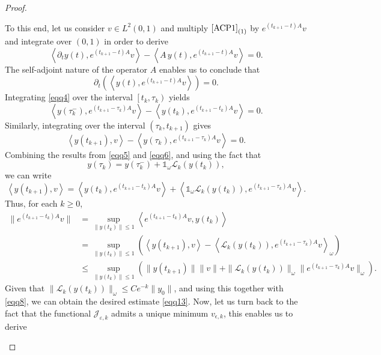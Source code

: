 \documentclass[sn-mathphys]{sn-jnl}
\begin{document}
\begin{proof}
\begin{enumerate}
\begin{equation}
    \end{equation}
    To this end, let us consider $v \in L^2(0,1)$ and multiply \(\eqref{ACP1}_{(1)}\) by $e^{(t_{k+1}-t)A} v$ and integrate over $(0,1)$ in order to derive
    \[\left\langle \partial_t y(t) , e^{(t_{k+1}-t)A} v \right\rangle - \left\langle A \,y(t) , e^{(t_{k+1}-t)A} v \right\rangle=0.\]
    The self-adjoint nature of the operator $A$ enables us to conclude that 
    \begin{equation}\label{eqq4}
        \partial_t \left( \left\langle y (t), e^{(t_{k+1}-t)A} v \right\rangle \right) =0.
    \end{equation}
    Integrating \eqref{eqq4} over the interval $\left[t_k , \tau_k\right)$ yields
    \begin{equation}\label{eqq5}
        \left\langle y(\tau_k^{-}) , e^{(t_{k+1}-\tau_k)A} v \right\rangle - \left\langle y(t_k) , e^{(t_{k+1}-t_k)A} v \right\rangle =0.
    \end{equation}
     Similarly, integrating over the interval  $\left(\tau_k, t_{k+1}\right)$ gives
    \begin{equation}\label{eqq6}
        \left\langle y(t_{k+1}) ,  v \right\rangle - \left\langle y(\tau_k) , e^{(t_{k+1}-\tau_k)A} v \right\rangle   =0.
    \end{equation}
    Combining the results from \eqref{eqq5} and \eqref{eqq6}, and using the fact that
    \[y(\tau_k) = y(\tau^{-}_{k}) + \mathds{1}_{\omega} \mathcal{L}_k (y(t_k)),\] 
    we can write
    \begin{equation}
        \left\langle y(t_{k+1}) , v \right\rangle = \left\langle y(t_k) , e^{(t_{k+1}-t_k)A} v \right\rangle + \left\langle \mathds{1}_{\omega} \mathcal{L}_k(y(t_k)) , e^{(t_{k+1}-\tau_k)A} v \right\rangle.
    \end{equation}
    Thus, for each $k\geq 0$,
    \begin{align*}
        \| e^{(t_{k+1}-t_k)A} v \|
        &= \sup_{\| y(t_k)\| \leq 1} \left\langle e^{(t_{k+1}-t_k)A} v , y(t_k) \right\rangle\nonumber\\
        &=\sup_{\| y(t_k)\| \leq 1} \left( \left\langle y(t_{k+1}) , v \right\rangle - \left\langle \mathcal{L}_k (y(t_k)) , e^{(t_{k+1}-\tau_k ) A} v \right\rangle_{\omega} \right)\nonumber\\
        &\leq \sup_{\| y(t_k)\| \leq 1} \left( \| y(t_{k+1})\| \| v\| + \| \mathcal{L}_k (y(t_k)) \|_{\omega} \| e^{(t_{k+1}-\tau_k)A} v\|_{\omega} \right).
    \end{align*}
    Given that $\| \mathcal{L}_k (y(t_k)) \|_{\omega} \leq C e^{-k} \| y_0\|$, and using this together with \eqref{eqq8}, we can obtain the desired estimate \eqref{eqq13}. Now, let us turn back to the fact that the functional $\mathcal{J}_{\varepsilon,k}$ admits a unique minimum $v_{\epsilon,k}$, this enables us to derive

\end{enumerate}
\end{proof}
\end{document}
